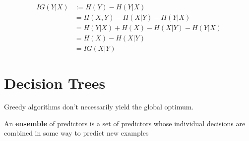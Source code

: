 \documentclass{article}
\begin{document}
	\begin{proposition}
		\begin{align}
			IG(Y|X) &:= H(Y) - H(Y|X) \\
			&= H(X, Y) - H(X|Y) - H(Y|X) \\
			&= H(Y|X) + H(X) - H(X|Y) - H(Y|X) \\
			&= H(X) - H(X|Y) \\
			&= IG(X|Y)
		\end{align}
	\end{proposition}
	
	\section{Decision Trees}
	\begin{remark}
		Greedy algorithms don't necessarily yield the global optimum.
	\end{remark}
	\begin{definition}
		An \textbf{ensemble} of predictors is a set of predictors whose individual decisions are combined in some way to predict new examples
	\end{definition}
	
\end{document}
